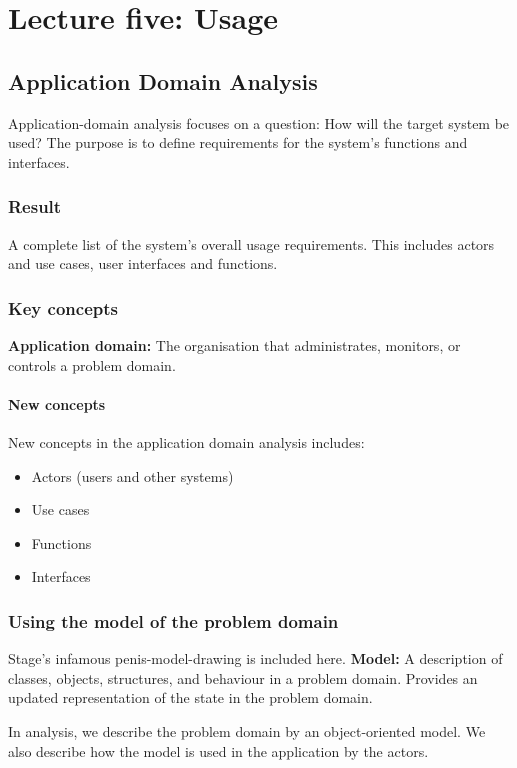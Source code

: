 \chapter{Lecture five: Usage}

\section{Application Domain Analysis}
Application-domain analysis focuses on a question: How will the target system be used? The purpose is to define requirements for the system's functions and interfaces.

\subsection{Result}
A complete list of the system's overall usage requirements. This includes actors and use cases, user interfaces and functions. 

\subsection{Key concepts}
\textbf{Application domain:} The organisation that administrates, monitors, or controls a problem domain. 

\subsubsection{New concepts}
New concepts in the application domain analysis includes:
\begin{itemize}
    \item Actors (users and other systems)
    \item Use cases
    \item Functions
    \item Interfaces
\end{itemize}

\subsection{Using the model of the problem domain}
Stage's infamous penis-model-drawing is included here.
\textbf{Model:} A description of classes, objects, structures, and behaviour in a problem domain. Provides an updated representation of the state in the problem domain. 

In analysis, we describe the problem domain by an object-oriented model. We also describe how the model is used in the application by the actors.

